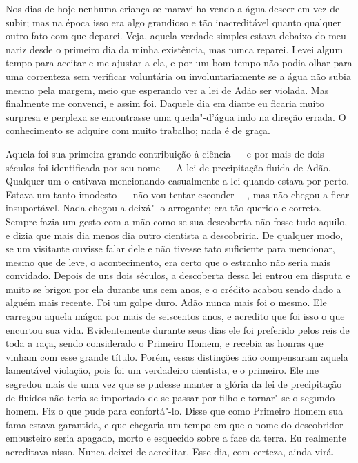 Nos dias de hoje nenhuma criança se maravilha vendo a água descer em vez de subir; mas
na época isso era algo grandioso e tão inacreditável quanto qualquer outro fato
com que deparei. Veja, aquela verdade simples estava debaixo do meu nariz desde o
primeiro dia da minha existência, mas nunca reparei. Levei algum tempo
para aceitar e me ajustar a ela, e por um bom tempo não podia olhar para uma
correnteza sem verificar voluntária ou involuntariamente se a água não subia mesmo
pela margem, meio que esperando ver a lei de Adão ser violada. Mas finalmente
me convenci, e assim foi. Daquele dia em diante eu ficaria muito surpresa e
perplexa se encontrasse uma queda"-d’água indo na direção errada. O conhecimento se
adquire com muito trabalho; nada é de graça.

Aquela foi sua primeira grande contribuição à ciência --- e por mais de dois séculos
foi identificada por seu nome --- A lei de precipitação fluida de Adão. Qualquer um
o cativava mencionando casualmente a lei quando estava por perto. Estava um tanto
imodesto --- não vou tentar esconder ---, mas não chegou a ficar insuportável.
Nada chegou a deixá"-lo arrogante; era tão querido e correto. Sempre fazia um gesto
com a mão como se sua descoberta não fosse tudo aquilo, e dizia que mais dia menos
dia outro cientista a descobriria. De qualquer modo, se um visitante ouvisse falar
dele e não tivesse tato suficiente para mencionar, mesmo que de leve, o acontecimento, era
certo que o estranho não seria mais convidado. Depois de uns dois séculos, a
descoberta dessa lei entrou em disputa e muito se brigou por ela durante uns cem anos,
e o crédito acabou sendo dado a alguém mais recente. Foi um golpe duro. 
Adão nunca mais foi o mesmo. Ele carregou aquela mágoa
por mais de seiscentos anos, e acredito que foi isso o que encurtou sua vida.
Evidentemente durante seus dias ele foi preferido pelos reis de toda a raça,
sendo considerado o Primeiro Homem, e recebia as honras que vinham com esse grande
título. Porém, essas distinções não compensaram aquela lamentável violação, pois
foi um verdadeiro cientista, e o primeiro. Ele me segredou mais de uma vez que se
pudesse manter a glória da lei de precipitação de fluidos não teria se
importado de se passar por filho e tornar"-se o segundo homem. Fiz o que pude para
confortá"-lo. Disse que como Primeiro Homem sua fama estava garantida, e que
chegaria um tempo em que o nome do descobridor embusteiro seria apagado, morto e
esquecido sobre a face da terra. Eu realmente acreditava nisso. Nunca deixei de
acreditar. Esse dia, com certeza, ainda virá.

